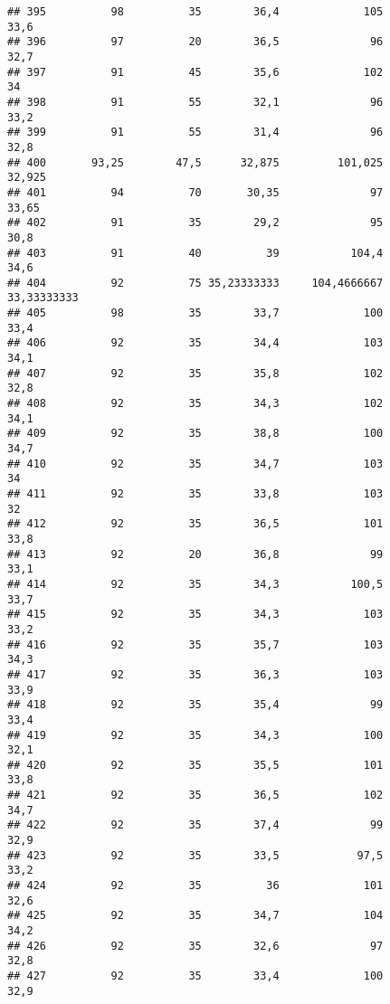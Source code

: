 \documentclass[
]{article}
\begin{document}
\begin{verbatim}
## 395          98          35        36,4             105                 33,6
## 396          97          20        36,5              96                 32,7
## 397          91          45        35,6             102                   34
## 398          91          55        32,1              96                 33,2
## 399          91          55        31,4              96                 32,8
## 400       93,25        47,5      32,875         101,025               32,925
## 401          94          70       30,35              97                33,65
## 402          91          35        29,2              95                 30,8
## 403          91          40          39           104,4                 34,6
## 404          92          75 35,23333333     104,4666667          33,33333333
## 405          98          35        33,7             100                 33,4
## 406          92          35        34,4             103                 34,1
## 407          92          35        35,8             102                 32,8
## 408          92          35        34,3             102                 34,1
## 409          92          35        38,8             100                 34,7
## 410          92          35        34,7             103                   34
## 411          92          35        33,8             103                   32
## 412          92          35        36,5             101                 33,8
## 413          92          20        36,8              99                 33,1
## 414          92          35        34,3           100,5                 33,7
## 415          92          35        34,3             103                 33,2
## 416          92          35        35,7             103                 34,3
## 417          92          35        36,3             103                 33,9
## 418          92          35        35,4              99                 33,4
## 419          92          35        34,3             100                 32,1
## 420          92          35        35,5             101                 33,8
## 421          92          35        36,5             102                 34,7
## 422          92          35        37,4              99                 32,9
## 423          92          35        33,5            97,5                 33,2
## 424          92          35          36             101                 32,6
## 425          92          35        34,7             104                 34,2
## 426          92          35        32,6              97                 32,8
## 427          92          35        33,4             100                 32,9

\end{verbatim}
\end{document}
